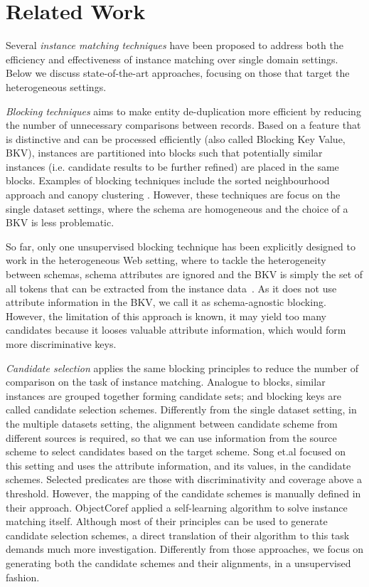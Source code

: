 
\section{Related Work}

Several \emph{instance matching techniques} have been proposed to address both the efficiency and effectiveness of instance matching over single domain settings. Below we discuss state-of-the-art approaches, focusing on those that target the heterogeneous settings.


\emph{Blocking techniques} \cite{hernandez_merge/purge_1995} aims to make entity de-duplication more efficient by reducing the number of unnecessary comparisons between records. Based on a feature that is distinctive and can be processed efficiently (also called Blocking Key Value, BKV), instances are partitioned into blocks such that potentially similar instances (i.e. candidate results to be further refined) are placed in the same blocks.   Examples of blocking techniques include the sorted neighbourhood approach and canopy clustering \cite{mccallum_efficient_2000}. However, these techniques are focus on the single dataset settings, where the schema are homogeneous and the choice of a BKV is less problematic. 

So far, only one unsupervised blocking technique has been explicitly designed to work in the heterogeneous Web setting, where to tackle the heterogeneity between schemas, schema attributes are ignored and the BKV is simply the set of all tokens that can be extracted from the instance data~\cite{papadakis_efficient_2011}. As it does not use attribute information in the BKV, we call it as schema-agnostic blocking. However, the limitation of this approach is known, it may yield too many candidates because it looses valuable attribute information, which would form more discriminative keys. 

\emph{Candidate selection} applies the same blocking principles to reduce the number of comparison on the task of instance matching. Analogue to blocks, similar instances are grouped together forming candidate sets; and blocking keys are called candidate selection schemes.  Differently from the single dataset setting, in the multiple datasets setting, the alignment between candidate scheme from different sources is required, so that we can use information from the source scheme to select candidates based on the target scheme. Song et.al \cite{DBLP:conf/semweb/SongH11} focused on this setting and uses the attribute information, and its values, in the candidate schemes. Selected predicates are those with discriminativity and coverage above a threshold. However, the mapping of the candidate schemes is manually defined in their approach. ObjectCoref\cite{DBLP:conf/www/HuCQ11} applied a self-learning algorithm to solve instance matching itself. Although most of their principles can be used to generate candidate selection schemes, a direct translation of their algorithm to this task demands much more investigation. Differently from those approaches, we focus on generating both the candidate schemes and their alignments, in a unsupervised fashion.

